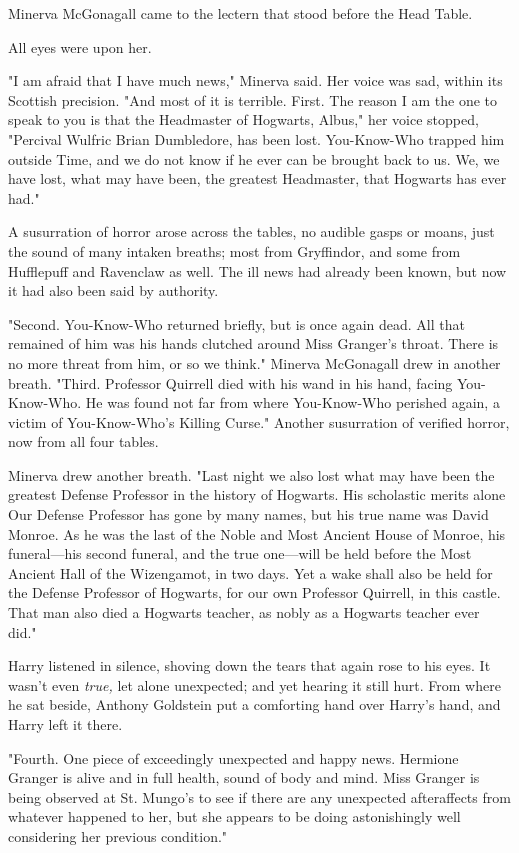 Minerva McGonagall came to the lectern that stood before the Head Table.

All eyes were upon her.

"I am afraid that I have much news," Minerva said. Her voice was sad, within
its Scottish precision. "And most of it is terrible. First. The reason I am the
one to speak to you is that the Headmaster of Hogwarts, Albus," her voice
stopped, "Percival Wulfric Brian Dumbledore, has been lost. You-Know-Who
trapped him outside Time, and we do not know if he ever can be brought back to
us. We, we have lost, what may have been, the greatest Headmaster, that
Hogwarts has ever had."

A susurration of horror arose across the tables, no audible gasps or moans,
just the sound of many intaken breaths; most from Gryffindor, and some from
Hufflepuff and Ravenclaw as well. The ill news had already been known, but now
it had also been said by authority.

"Second. You-Know-Who returned briefly, but is once again dead. All that
remained of him was his hands clutched around Miss Granger's throat. There is
no more threat from him, or so we think." Minerva McGonagall drew in another
breath. "Third. Professor Quirrell died with his wand in his hand, facing
You-Know-Who. He was found not far from where You-Know-Who perished again, a
victim of You-Know-Who's Killing Curse." Another susurration of verified
horror, now from all four tables.

Minerva drew another breath. "Last night we also lost what may have been the
greatest Defense Professor in the history of Hogwarts. His scholastic merits
alone{\el} Our Defense Professor has gone by many names, but his true name
was David Monroe. As he was the last of the Noble and Most Ancient House of
Monroe, his funeral—his second funeral, and the true one—will be held
before the Most Ancient Hall of the Wizengamot, in two days. Yet a wake shall
also be held for the Defense Professor of Hogwarts, for our own Professor
Quirrell, in this castle. That man also died a Hogwarts teacher, as nobly as a
Hogwarts teacher ever did."

Harry listened in silence, shoving down the tears that again rose to his eyes.
It wasn't even \emph{true,} let alone unexpected; and yet hearing it still
hurt. From where he sat beside, Anthony Goldstein put a comforting hand over
Harry's hand, and Harry left it there.

"Fourth. One piece of exceedingly unexpected and happy news. Hermione Granger
is alive and in full health, sound of body and mind. Miss Granger is being
observed at St. Mungo's to see if there are any unexpected afteraffects from
whatever happened to her, but she appears to be doing astonishingly well
considering her previous condition."

